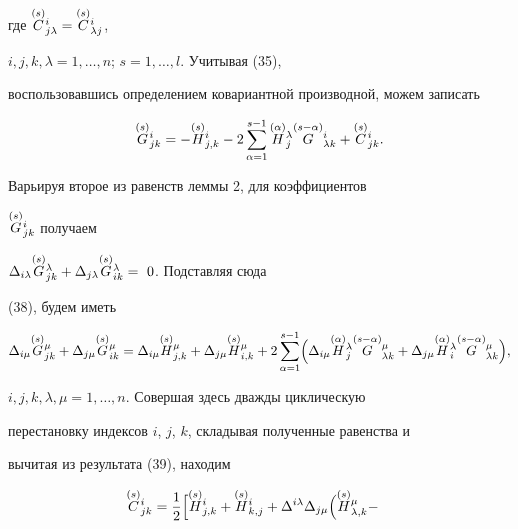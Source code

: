 \begin{pf}
где $\overset{(s)}{C}{}^i_{j\lambda}=\overset{(s)}{C}{}^i_{\lambda j}$,


$i,j,k,\lambda=1,\dotsc,n$; $s=1,\dotsc,l$. Учитывая (35),


воспользовавшись определением ковариантной производной, можем записать


\begin{equation}


\sv{(s)}G^i_{jk}=-\sv{(s)}H^i_{j,k}-


2\sum_{\alpha=1}^{s-1}\sv{(\alpha)}H^{\lambda}_j\sv{(s-\alpha)}


G^i_{\lambda k}+\sv{(s)}C^i_{jk}.


\end{equation}


Варьируя второе из равенств леммы 2, для коэффициентов


$\overset{(s)}{G}{}^i_{jk}$ получаем


$\Delta_{i\lambda}\sv{(s)}G^{\lambda}_{jk}+


\Delta_{j\lambda}\sv{(s)}G^{\lambda}_{ik}=~0$. Подставляя сюда


(38), будем иметь


\begin{equation}


\Delta_{i\mu}\sv{(s)}G^{\mu}_{jk}+\Delta_{j\mu}\sv{(s)}G^{\mu}_{ik}=


\Delta_{i\mu}\sv{(s)}H^{\mu}_{j,k}+


\Delta_{j\mu}\sv{(s)}H^{\mu}_{i,k}+


2\sum_{\alpha=1}^{s-1}\Bigl(\Delta_{i\mu}\sv{(\alpha)}H^{\lambda}_j


\sv{(s-\alpha)}G^{\mu}_{\lambda k}+


\Delta_{j\mu}\sv{(\alpha)}H^{\lambda}_i


\sv{(s-\alpha)}G^{\mu}_{\lambda k}\Bigr),


\end{equation}


$i,j,k,\lambda,\mu=1,\dotsc,n$. Совершая здесь дважды циклическую


перестановку индексов $i$, $j$, $k$, складывая полученные равенства и


вычитая из результата (39), находим


\begin{align*}


\sv{(s)}C^i_{jk}&=\frac{1}{2}\Bigl[\sv{(s)}H^i_{j,k}+\sv{(s)}H^i_{k,j}+


\Delta^{i\lambda}\Delta_{j\mu}\Bigl(\sv{(s)}H^{\mu}_{\lambda,k}-



\end{align*}
\end{pf}
